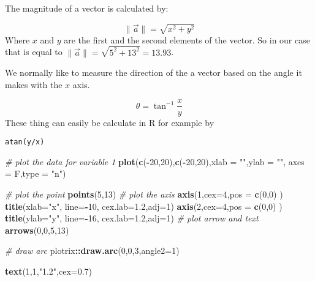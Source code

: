 \documentclass[
]{book}
\newenvironment{Shaded}{\begin{snugshade}}{\end{snugshade}}
\newcommand{\CommentTok}[1]{\textcolor[rgb]{0.56,0.35,0.01}{\textit{#1}}}
\newcommand{\DataTypeTok}[1]{\textcolor[rgb]{0.13,0.29,0.53}{#1}}
\newcommand{\DecValTok}[1]{\textcolor[rgb]{0.00,0.00,0.81}{#1}}
\newcommand{\FloatTok}[1]{\textcolor[rgb]{0.00,0.00,0.81}{#1}}
\newcommand{\KeywordTok}[1]{\textcolor[rgb]{0.13,0.29,0.53}{\textbf{#1}}}
\newcommand{\NormalTok}[1]{#1}
\newcommand{\OperatorTok}[1]{\textcolor[rgb]{0.81,0.36,0.00}{\textbf{#1}}}
\newcommand{\StringTok}[1]{\textcolor[rgb]{0.31,0.60,0.02}{#1}}
\theoremstyle{definition}
\theoremstyle{definition}
\theoremstyle{definition}
\theoremstyle{remark}
\begin{document}
The magnitude of a vector is calculated by:

\[\|\vec{a}\|=\sqrt{x^2+y^2}\]
Where \(x\) and \(y\) are the first and the second elements of the vector. So in our case that is equal to \(\|\vec{a}\|=\sqrt{5^2+13^2}=13.93\).

We normally like to measure the direction of the a vector based on the angle it makes with the \(x\) axis.

\[\theta=\tan^{-1}\frac{x}{y}\]
These thing can easily be calculate in R for example by

\begin{verbatim}
atan(y/x)
\end{verbatim}

\begin{Shaded}
\begin{Highlighting}[]
\CommentTok{# plot the data for variable 1}
\KeywordTok{plot}\NormalTok{(}\KeywordTok{c}\NormalTok{(}\OperatorTok{-}\DecValTok{20}\NormalTok{,}\DecValTok{20}\NormalTok{),}\KeywordTok{c}\NormalTok{(}\OperatorTok{-}\DecValTok{20}\NormalTok{,}\DecValTok{20}\NormalTok{),}\DataTypeTok{xlab =} \StringTok{""}\NormalTok{,}\DataTypeTok{ylab =} \StringTok{""}\NormalTok{,}
 \DataTypeTok{axes =}\NormalTok{ F,}\DataTypeTok{type =} \StringTok{"n"}\NormalTok{)}

\CommentTok{# plot the point}
\KeywordTok{points}\NormalTok{(}\DecValTok{5}\NormalTok{,}\DecValTok{13}\NormalTok{)}
\CommentTok{# plot the axis}
\KeywordTok{axis}\NormalTok{(}\DecValTok{1}\NormalTok{,}\DataTypeTok{cex=}\DecValTok{4}\NormalTok{,}\DataTypeTok{pos =} \KeywordTok{c}\NormalTok{(}\DecValTok{0}\NormalTok{,}\DecValTok{0}\NormalTok{) )}
\KeywordTok{title}\NormalTok{(}\DataTypeTok{xlab=}\StringTok{"x"}\NormalTok{, }\DataTypeTok{line=}\OperatorTok{-}\DecValTok{10}\NormalTok{, }\DataTypeTok{cex.lab=}\FloatTok{1.2}\NormalTok{,}\DataTypeTok{adj=}\DecValTok{1}\NormalTok{)}
\KeywordTok{axis}\NormalTok{(}\DecValTok{2}\NormalTok{,}\DataTypeTok{cex=}\DecValTok{4}\NormalTok{,}\DataTypeTok{pos =} \KeywordTok{c}\NormalTok{(}\DecValTok{0}\NormalTok{,}\DecValTok{0}\NormalTok{) )}
\KeywordTok{title}\NormalTok{(}\DataTypeTok{ylab=}\StringTok{"y"}\NormalTok{, }\DataTypeTok{line=}\OperatorTok{-}\DecValTok{16}\NormalTok{, }\DataTypeTok{cex.lab=}\FloatTok{1.2}\NormalTok{,}\DataTypeTok{adj=}\DecValTok{1}\NormalTok{)}
\CommentTok{# plot arrow and text}
\KeywordTok{arrows}\NormalTok{(}\DecValTok{0}\NormalTok{,}\DecValTok{0}\NormalTok{,}\DecValTok{5}\NormalTok{,}\DecValTok{13}\NormalTok{)}

\CommentTok{# draw arc}
\NormalTok{plotrix}\OperatorTok{::}\KeywordTok{draw.arc}\NormalTok{(}\DecValTok{0}\NormalTok{,}\DecValTok{0}\NormalTok{,}\DecValTok{3}\NormalTok{,}\DataTypeTok{angle2=}\DecValTok{1}\NormalTok{)}

\KeywordTok{text}\NormalTok{(}\DecValTok{1}\NormalTok{,}\DecValTok{1}\NormalTok{,}\StringTok{"1.2"}\NormalTok{,}\DataTypeTok{cex=}\FloatTok{0.7}\NormalTok{)}
\end{Highlighting}
\end{Shaded}
\end{document}

